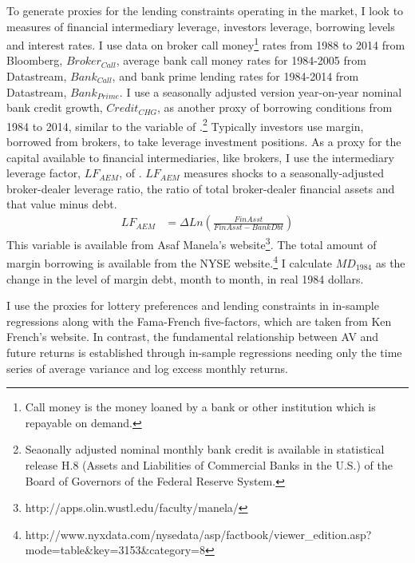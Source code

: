 To generate proxies for the lending constraints operating in the market, I look to measures of financial intermediary leverage, investors leverage, borrowing levels and interest rates. I use data
on broker call money\footnote{Call money is the money loaned by a bank or other institution which is repayable on demand.} rates from 1988 to 2014 from Bloomberg, $Broker_{Call}$, average bank call money rates for 1984-2005 from Datastream, $Bank_{Call}$, and bank prime lending rates for 1984-2014 from Datastream, $Bank_{Prime}$. I use a seasonally adjusted version year-on-year nominal bank credit growth, $Credit_{CHG}$, as another proxy of borrowing conditions from 1984 to 2014, similar to the variable of \citet{Gandhi2016}.\footnote{Seaonally adjusted nominal monthly bank credit is available in statistical release H.8 (Assets and Liabilities of Commercial Banks in the U.S.) of the Board of Governors of the Federal Reserve System.} Typically investors
use margin, borrowed from brokers, to take leverage investment positions. As a proxy for the capital available to financial intermediaries, like brokers, I use the intermediary leverage factor, $LF_{AEM}$, of \citet{adrian2014financial}. $LF_{AEM}$ measures shocks to a seasonally-adjusted broker-dealer leverage ratio, the ratio of total broker-dealer financial assets and that value minus debt.
\begin{align}
	LF_{AEM} &= \Delta Ln(\frac{FinAsst}{FinAsst - BankDbt})
\end{align}
This variable is available from Asaf Manela's website\footnote{http://apps.olin.wustl.edu/faculty/manela/}. The total amount of margin borrowing is available from the NYSE website.\footnote{http://www.nyxdata.com/nysedata/asp/factbook/viewer\_edition.asp?mode=table\&key=3153\&category=8} I calculate $MD_{1984}$ as the change in the level of margin debt, month to month, in real 1984 dollars.

I use the proxies for lottery preferences and lending constraints in in-sample regressions along with the Fama-French five-factors, which are taken from Ken French's website. In contrast, the fundamental relationship between AV and future returns is established through in-sample regressions needing only the time series of average variance and log excess monthly returns.